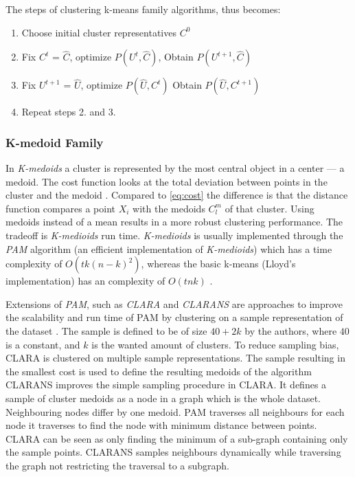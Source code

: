 \documentclass[../report.tex]{subfiles}
\begin{document}
The steps of clustering k-means family algorithms, thus becomes:

\begin{enumerate}
  \item Choose initial cluster representatives $C^0$
  \item Fix $C^t$ = $\hat{C}$, optimize $P(U^{t}, \hat{ C })$, Obtain $P(U^{t + 1}, \hat{ C })$
  \item Fix $U^{t + 1}$ = $\hat{U}$, optimize $P(\hat{U}, C^t)$ Obtain $P(\hat{ U }, C^{t + 1})$
  \item Repeat steps 2. and 3.
\end{enumerate}


\subsubsection{K-medoid Family}
In \textit{K-medoids} a cluster is represented by the most central object in a center --- a medoid. The cost function looks at the total deviation between points in the cluster and the medoid \cite{Ng2002}. Compared to \cref{eq:cost} the difference is that the distance function compares a point $X_i$ with the medoids $C_l^m$ of that cluster. Using medoids instead of a mean results in a more robust clustering performance. The tradeoff is \textit{K-medioids} run time. \textit{K-medioids} is usually implemented through the \textit{PAM} algorithm (an efficient implementation of \textit{K-medioids}) which has a time complexity of $O(tk(n − k)^2)$, whereas the basic k-means (Lloyd's implementation) has an complexity of $O(tnk)$ \cite{Ng2002}.

Extensions of \textit{PAM}, such as \textit{CLARA} and \textit{CLARANS} are approaches to improve the scalability and run time of PAM by clustering on a sample representation of the dataset \cite{Ng2002}. The sample is defined to be of size $40 + 2k$ by the authors, where $40$ is a constant, and $k$ is the wanted amount of clusters. To reduce sampling bias, CLARA is clustered on multiple sample representations. The sample resulting in the smallest cost is used to define the resulting medoids of the algorithm CLARANS improves the simple sampling procedure in CLARA. It defines a sample of cluster medoids as a node in a graph which is the whole dataset. Neighbouring nodes differ by one medoid. PAM traverses all neighbours for each node it traverses to find the node with minimum distance between points. CLARA can be seen as only finding the minimum of a sub-graph containing only the sample points. CLARANS samples neighbours dynamically  while traversing the graph not restricting the traversal to a subgraph.
\end{document}
